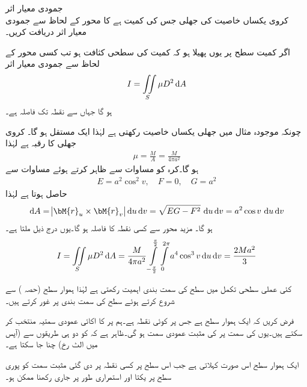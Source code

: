 \quad جمودی معیار اثر\\
کروی یکساں خاصیت کی جھلی  جس کی کمیت  ہے کا  محور کے لحاظ سے جمودی معیار اثر دریافت کریں۔

اگر کمیت سطح  پر یوں پھیلا ہو کہ کمیت کی سطحی کثافت  ہو تب کسی محور  کے لحاظ سے جمودی معیار اثر
\begin{align}
I=\iint\limits_S \mu D^2\dif A
\end{align}
ہو گا جہاں   سے نقطہ  تک فاصلہ  ہے۔

چونکہ موجودہ مثال میں جھلی یکساں خاصیت رکھتی ہے لہٰذا  ایک مستقل ہو گا۔ کروی جھلی کا رقبہ  ہے لہٰذا
\begin{align*}
\mu=\frac{M}{A}=\frac{M}{4\pi a^2}
\end{align*}
ہو گا۔کرہ کو مساوات  سے ظاہر کرتے ہوئے مساوات  سے
\begin{align*}
E=a^2\cos^2 v,\quad F=0,\quad G=a^2
\end{align*}
حاصل ہوتا ہے لہٰذا
\begin{align*}
\dif A=\abs{\bM{r}_u\times \bM{r}_v}\dif u\dif v=\sqrt{EG-F^2}\,\dif u\dif v=a^2\cos v\,\dif u\dif v
\end{align*}
ہو گا۔ مزید  محور سے کسی نقطہ  کا فاصلہ  ہو گا۔یوں درج ذیل ملتا ہے۔
\begin{align*}
I=\iint\limits_S \mu D^2 \dif A=\frac{M}{4\pi a^2}\int\limits_{-\frac{\pi}{2}}^{\frac{\pi}{2}} \int\limits_{0}^{2\pi} a^4\cos^3 v \dif u\dif v=\frac{2Ma^2}{3}
\end{align*}

کئی عملی سطحی تکمل میں سطح کی سمت بندی اہمیت رکھتی ہے لہٰذا ہموار سطح (حصہ ) سے شروع کرتے ہوئے  سطح کی سمت بندی پر غور کرتے ہیں۔

فرض کریں کہ  ایک ہموار سطح ہے جس پر  کوئی نقطہ ہے۔ہم  پر  کا اکائی عمودی سمتیہ  منتخب کر سکتے ہیں۔یوں  کی سمت  پر  کی مثبت عمودی سمت  ہو گی۔ظاہر ہے کہ  کو دو ہی  طریقوں سے (آپس میں الٹ رخ) چنا جا سکتا ہے۔  

ایک ہموار سطح اس صورت  کہلاتی ہے جب اس سطح پر کسی نقطہ  پر دی  گئی مثبت سمت کو پوری سطح پر یکتا اور استمراری طور پر جاری رکھنا ممکن ہو۔

